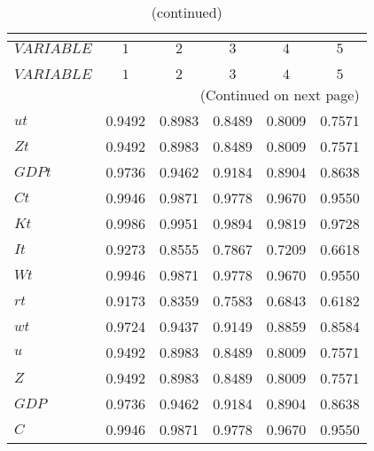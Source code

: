  
\begin{center}
\begin{longtable}{lccccc} 
\caption{AUTOCORRELATION OF SIMULATED VARIABLES}\\
 \label{Table:sim_autocorr_matrix}\\
\toprule 
$VARIABLE  $	 & 	 $         1$	 & 	 $         2$	 & 	 $         3$	 & 	 $         4$	 & 	 $         5$\\
\midrule \endfirsthead 
\caption{(continued)}\\
 \toprule \\ 
$VARIABLE  $	 & 	 $         1$	 & 	 $         2$	 & 	 $         3$	 & 	 $         4$	 & 	 $         5$\\
\midrule \endhead 
\midrule \multicolumn{6}{r}{(Continued on next page)} \\ \bottomrule \endfoot 
\bottomrule \endlastfoot 
$ut        $	 & 	    0.9492	 & 	    0.8983	 & 	    0.8489	 & 	    0.8009	 & 	    0.7571 \\ 
$Zt        $	 & 	    0.9492	 & 	    0.8983	 & 	    0.8489	 & 	    0.8009	 & 	    0.7571 \\ 
$GDPt      $	 & 	    0.9736	 & 	    0.9462	 & 	    0.9184	 & 	    0.8904	 & 	    0.8638 \\ 
$Ct        $	 & 	    0.9946	 & 	    0.9871	 & 	    0.9778	 & 	    0.9670	 & 	    0.9550 \\ 
$Kt        $	 & 	    0.9986	 & 	    0.9951	 & 	    0.9894	 & 	    0.9819	 & 	    0.9728 \\ 
$It        $	 & 	    0.9273	 & 	    0.8555	 & 	    0.7867	 & 	    0.7209	 & 	    0.6618 \\ 
$Wt        $	 & 	    0.9946	 & 	    0.9871	 & 	    0.9778	 & 	    0.9670	 & 	    0.9550 \\ 
$rt        $	 & 	    0.9173	 & 	    0.8359	 & 	    0.7583	 & 	    0.6843	 & 	    0.6182 \\ 
$wt        $	 & 	    0.9724	 & 	    0.9437	 & 	    0.9149	 & 	    0.8859	 & 	    0.8584 \\ 
$u         $	 & 	    0.9492	 & 	    0.8983	 & 	    0.8489	 & 	    0.8009	 & 	    0.7571 \\ 
$Z         $	 & 	    0.9492	 & 	    0.8983	 & 	    0.8489	 & 	    0.8009	 & 	    0.7571 \\ 
$GDP       $	 & 	    0.9736	 & 	    0.9462	 & 	    0.9184	 & 	    0.8904	 & 	    0.8638 \\ 
$C         $	 & 	    0.9946	 & 	    0.9871	 & 	    0.9778	 & 	    0.9670	 & 	    0.9550 \\ 

\end{longtable}
\end{center}
